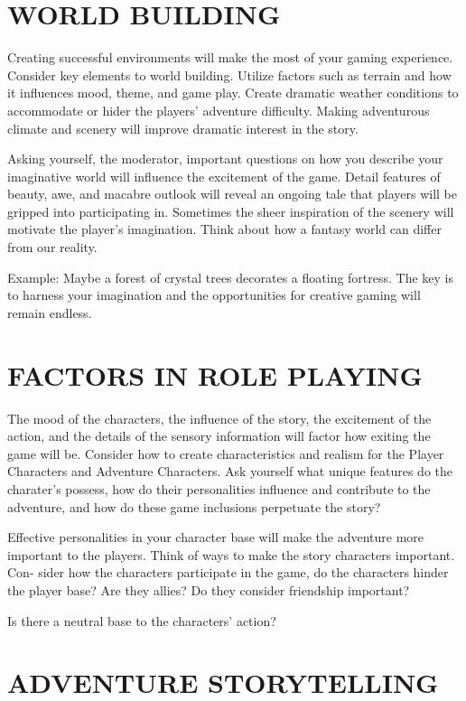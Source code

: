 \documentclass{article}
\begin{document}
\section{WORLD BUILDING}

	Creating successful environments will make the most of your gaming experience.
Consider key elements to world building. Utilize factors such as terrain and how it influences
mood, theme, and game play. Create dramatic weather conditions to accommodate or hider the
players’ adventure difficulty. Making adventurous climate and scenery will improve dramatic
interest in the story.

	Asking yourself, the moderator, important questions on how you describe your imaginative
world will influence the excitement of the game. Detail features of beauty, awe, and macabre
outlook will reveal an ongoing tale that players will be gripped into participating in.
Sometimes the sheer inspiration of the scenery will motivate the player’s imagination. Think
about how a fantasy world can differ from our reality.

Example: Maybe a forest of crystal trees decorates a floating fortress. The key is to harness your
imagination and the opportunities for creative gaming will remain endless.

\section{FACTORS IN ROLE PLAYING}

	The mood of the characters, the influence of the story, the excitement of the action, and
the details of the sensory information will factor how exiting the game will be. Consider how to
create characteristics and realism for the Player Characters and Adventure Characters. Ask
yourself what unique features do the charater’s possess, how do their personalities influence and
contribute to the adventure, and how do these game inclusions perpetuate the story?

	Effective personalities in your character base will make the adventure more important to the
players. Think of ways to make the story characters important. Con- sider how the characters
participate in the game, do the characters hinder the player base? Are they allies? Do they
consider friendship important?
	
    Is there a neutral base to the characters’ action?

\section{ADVENTURE STORYTELLING}
\end{document}
